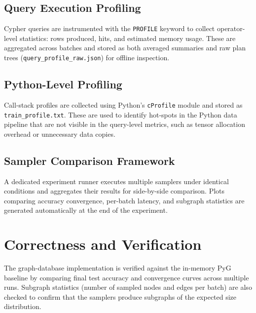 \subsection{Query Execution Profiling}\label{sec:query_profiling}

Cypher queries are instrumented with the \texttt{PROFILE} keyword to collect
operator-level statistics: rows produced,  hits, and estimated memory
usage. These are aggregated across batches and stored as both averaged 
summaries and raw plan trees (\texttt{query\_profile\_raw.json}) for offline
inspection.


\subsection{Python-Level Profiling}\label{sec:python_profiling}

Call-stack profiles are collected using Python's \texttt{cProfile} module and stored
as \texttt{train\_profile.txt}. These are used to identify hot-spots in the Python
data pipeline that are not visible in the query-level metrics, such as tensor
allocation overhead or unnecessary data copies.


\subsection{Sampler Comparison Framework}\label{sec:sampler_comparison}

A dedicated experiment runner executes multiple samplers under identical conditions
and aggregates their results for side-by-side comparison. Plots comparing accuracy
convergence, per-batch latency, and subgraph statistics are generated automatically
at the end of the experiment.


\section{Correctness and Verification}\label{sec:correctness}

The graph-database implementation is verified against the in-memory PyG baseline by
comparing final test accuracy and convergence curves across multiple runs. Subgraph
statistics (number of sampled nodes and edges per batch) are also checked to confirm
that the samplers produce subgraphs of the expected size distribution.
